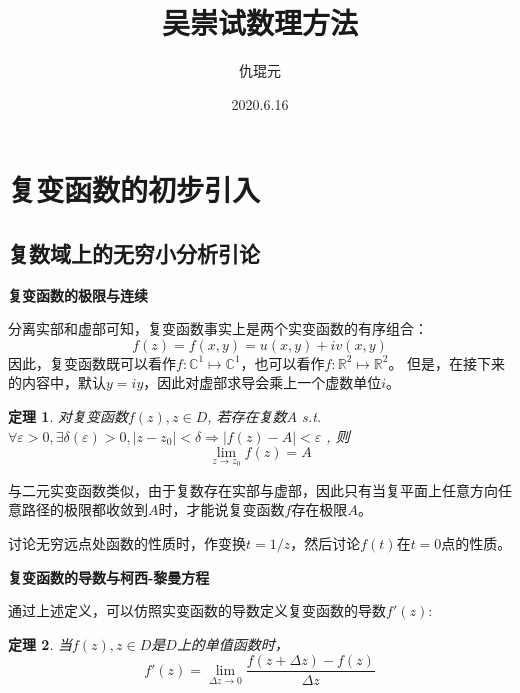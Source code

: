 \documentclass[UTF8]{ctexart}
\newcommand{\tmtextbf}[1]{{\bfseries{#1}}}
\newtheorem{theorem}{定理}
\begin{document}
\begin{titlepage}
\title{吴崇试数理方法}
\author{仇琨元}
\date{2020.6.16}
\maketitle
\end{titlepage}

\section{复变函数的初步引入}

\subsection{复数域上的无穷小分析引论}
\tmtextbf{复变函数的极限与连续}

分离实部和虚部可知，复变函数事实上是两个实变函数的有序组合：
\[ f (z) = f (x, y) = u (x, y) + i v (x, y) \]
因此，复变函数既可以看作$f : \mathbb{C}^1 \mapsto\mathbb{C}^1$，也可以看作$f : \mathbb{R}^2 \mapsto\mathbb{R}^2$。
但是，在接下来的内容中，默认$y = iy$，因此对虚部求导会乘上一个虚数单位$i$。

\begin{theorem}
  对复变函数$f (z), z \in D$, 若存在复数$A$ s.t. $\forall \varepsilon > 0, \exists \delta (\varepsilon) > 0, | z - z_0 | < \delta \Rightarrow | f (z) - A | < \varepsilon$
  , 则
  \begin{equation}
    \lim_{z \rightarrow z_0} f (z) = A
  \end{equation}
\end{theorem}

与二元实变函数类似，由于复数存在实部与虚部，因此只有当复平面上任意方向任意路径的极限都收敛到$A$时，才能说复变函数$f$存在极限$A$。

讨论无穷远点处函数的性质时，作变换$t = 1 /
z$，然后讨论$f (t)$在$t = 0$点的性质。

\tmtextbf{复变函数的导数与柯西-黎曼方程}

通过上述定义，可以仿照实变函数的导数定义复变函数的导数$f'
(z)$:

\begin{theorem}
  当$f (z), z \in D$是$D$上的单值函数时，
  \begin{equation}
    f' (z) = \lim_{\Delta z \rightarrow 0} \frac{f (z + \Delta z) - f
    (z)}{\Delta z}
  \end{equation}
\end{theorem}
\end{document}
